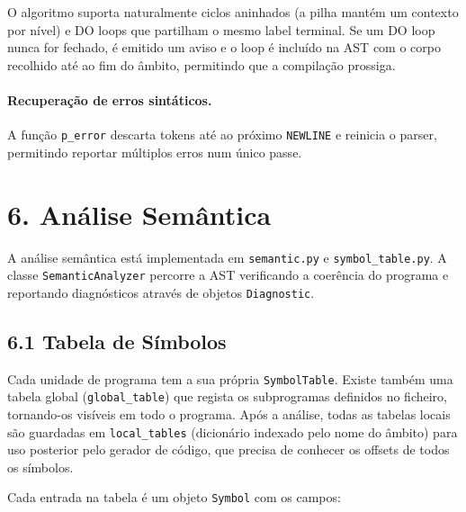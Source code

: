 \documentclass[a4paper]{article}
\begin{document}
\vspace{0.2cm}

\noindent O algoritmo suporta naturalmente ciclos aninhados (a pilha mantém um contexto por nível) e DO loops que partilham o mesmo label terminal. Se um DO loop nunca for fechado, é emitido um aviso e o loop é incluído na AST com o corpo recolhido até ao fim do âmbito, permitindo que a compilação prossiga.

\paragraph{Recuperação de erros sintáticos.} A função \texttt{p\_error} descarta tokens até ao próximo \texttt{NEWLINE} e reinicia o parser, permitindo reportar múltiplos erros num único passe.

\section*{6. Análise Semântica}

\noindent A análise semântica está implementada em \texttt{semantic.py} e \texttt{symbol\_table.py}. A classe \texttt{SemanticAnalyzer} percorre a AST verificando a coerência do programa e reportando diagnósticos através de objetos \texttt{Diagnostic}.

\subsection*{6.1 Tabela de Símbolos}

\noindent Cada unidade de programa tem a sua própria \texttt{SymbolTable}. Existe também uma tabela global (\texttt{global\_table}) que regista os subprogramas definidos no ficheiro, tornando-os visíveis em todo o programa. Após a análise, todas as tabelas locais são guardadas em \texttt{local\_tables} (dicionário indexado pelo nome do âmbito) para uso posterior pelo gerador de código, que precisa de conhecer os offsets de todos os símbolos.

\vspace{0.2cm}

\noindent Cada entrada na tabela é um objeto \texttt{Symbol} com os campos:
\end{document}
